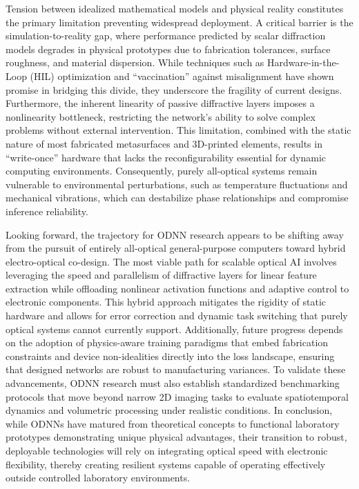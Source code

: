 Tension between idealized mathematical models and physical reality constitutes the primary limitation preventing widespread deployment. A critical barrier is the simulation-to-reality gap, where performance predicted by scalar diffraction models degrades in physical prototypes due to fabrication tolerances, surface roughness, and material dispersion. While techniques such as Hardware-in-the-Loop (HIL) optimization and ``vaccination'' against misalignment have shown promise in bridging this divide, they underscore the fragility of current designs. Furthermore, the inherent linearity of passive diffractive layers imposes a nonlinearity bottleneck, restricting the network's ability to solve complex problems without external intervention. This limitation, combined with the static nature of most fabricated metasurfaces and 3D-printed elements, results in ``write-once'' hardware that lacks the reconfigurability essential for dynamic computing environments. Consequently, purely all-optical systems remain vulnerable to environmental perturbations, such as temperature fluctuations and mechanical vibrations, which can destabilize phase relationships and compromise inference reliability.

Looking forward, the trajectory for ODNN research appears to be shifting away from the pursuit of entirely all-optical general-purpose computers toward hybrid electro-optical co-design. The most viable path for scalable optical AI involves leveraging the speed and parallelism of diffractive layers for linear feature extraction while offloading nonlinear activation functions and adaptive control to electronic components. This hybrid approach mitigates the rigidity of static hardware and allows for error correction and dynamic task switching that purely optical systems cannot currently support. Additionally, future progress depends on the adoption of physics-aware training paradigms that embed fabrication constraints and device non-idealities directly into the loss landscape, ensuring that designed networks are robust to manufacturing variances. To validate these advancements, ODNN research must also establish standardized benchmarking protocols that move beyond narrow 2D imaging tasks to evaluate spatiotemporal dynamics and volumetric processing under realistic conditions. In conclusion, while ODNNs have matured from theoretical concepts to functional laboratory prototypes demonstrating unique physical advantages, their transition to robust, deployable technologies will rely on integrating optical speed with electronic flexibility, thereby creating resilient systems capable of operating effectively outside controlled laboratory environments.
